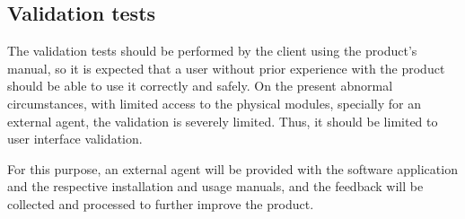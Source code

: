 %
%

\subsection{Validation tests}%
\label{sec:orgff1a37d}
The validation tests should be performed by the client using the product’s
manual, so it is expected that a user without prior experience with the product
should be able to use it correctly and safely. On the present abnormal
circumstances, with limited access to the physical modules, specially for an
external agent, the validation is severely limited.
Thus, it should be limited to user interface validation.

For this purpose, an external agent will be provided with the software
application and the respective installation and usage manuals, and the feedback
will be collected and processed to further improve the product.
